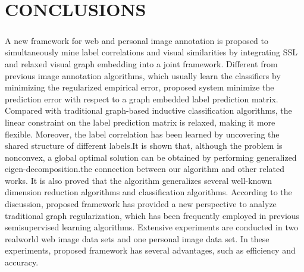 \documentclass[a4paper,11pt]{report}
\begin{document}
\chapter{CONCLUSIONS
}
\paragraph{}A new framework for web and
personal image annotation is proposed to simultaneously
mine label correlations and visual similarities by integrating
SSL and relaxed visual graph embedding into a joint framework.
Different from previous image annotation algorithms, which
usually learn the classifiers by minimizing the regularized empirical
error, proposed system minimize the prediction error
with respect to a graph embedded label prediction matrix. Compared
with traditional graph-based inductive classification algorithms,
the linear constraint on the label prediction matrix is relaxed,
making it more flexible. Moreover, the label correlation
has been learned by uncovering the shared structure of different
labels.It is shown that, although the problem is nonconvex,
a global optimal solution can be obtained by performing generalized
eigen-decomposition.the connection between our algorithm and
other related works. It is also proved that the algorithm generalizes
several well-known dimension reduction algorithms and
classification algorithms. According to the discussion, proposed framework has provided a new perspective
to analyze traditional graph regularization, which has been
frequently employed in previous semisupervised learning algorithms.
Extensive experiments are conducted in two realworld
web image data sets and one personal image data set. In
these experiments, proposed framework has several
advantages, such as efficiency and accuracy.
\end{document}
